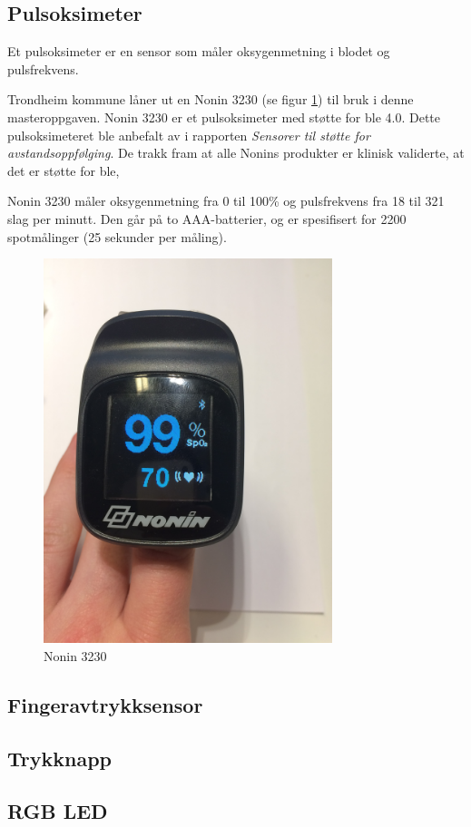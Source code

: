 \subsection{Pulsoksimeter}
Et pulsoksimeter er en sensor som måler oksygenmetning i blodet og pulsfrekvens.

Trondheim kommune låner ut en Nonin 3230 (se figur \ref{fig:nonin-3230}) til bruk i denne masteroppgaven.
Nonin 3230 er et pulsoksimeter med støtte for \gls{ble} 4.0. Dette pulsoksimeteret ble anbefalt av \citet{austad2016sensorer}
i rapporten \textit{Sensorer til støtte for avstandsoppfølging}. De trakk fram at alle Nonins produkter
er klinisk validerte, at det er støtte for \gls{ble}, %

Nonin 3230 måler oksygenmetning fra 0 til 100\% og pulsfrekvens fra 18 til 321 slag per minutt. Den går på to
AAA-batterier, og er spesifisert for 2200 spotmålinger (25 sekunder per måling).

\begin{figure}
\includegraphics[width=0.75\textwidth, center]{fig/prototype/nonin3230ble}
\caption{Nonin 3230}
\label{fig:nonin-3230}
\end{figure}

\subsection{Fingeravtrykksensor}
\subsection{Trykknapp}
\subsection{RGB LED}
